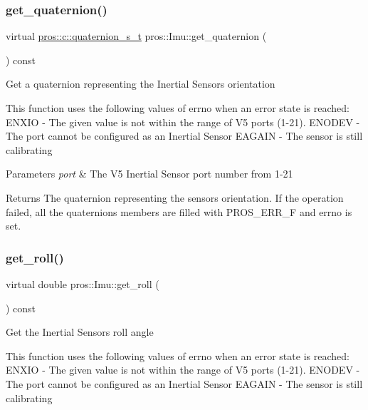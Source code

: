 \subsubsection{\texorpdfstring{get\+\_\+quaternion()}{get\_quaternion()}}
{\footnotesize\ttfamily virtual \hyperlink{imu_8h_a1f3d4bf4251e6ce7cb374297de6390a1}{pros\+::c\+::quaternion\+\_\+s\+\_\+t} pros\+::\+Imu\+::get\+\_\+quaternion (\begin{DoxyParamCaption}{ }\end{DoxyParamCaption}) const\hspace{0.3cm}{\ttfamily [virtual]}}

Get a quaternion representing the Inertial Sensor\textquotesingle{}s orientation

This function uses the following values of errno when an error state is reached\+: E\+N\+X\+IO -\/ The given value is not within the range of V5 ports (1-\/21). E\+N\+O\+D\+EV -\/ The port cannot be configured as an Inertial Sensor E\+A\+G\+A\+IN -\/ The sensor is still calibrating


\begin{DoxyParams}{Parameters}
{\em port} & The V5 Inertial Sensor port number from 1-\/21 \\
\hline
\end{DoxyParams}
\begin{DoxyReturn}{Returns}
The quaternion representing the sensor\textquotesingle{}s orientation. If the operation failed, all the quaternion\textquotesingle{}s members are filled with P\+R\+O\+S\+\_\+\+E\+R\+R\+\_\+F and errno is set. 
\end{DoxyReturn}
\mbox{\label{classpros_1_1Imu_a8ec8c7bbb7ee9d9d1c9dca5d992c57b1}} 
\subsubsection{\texorpdfstring{get\+\_\+roll()}{get\_roll()}}
{\footnotesize\ttfamily virtual double pros\+::\+Imu\+::get\+\_\+roll (\begin{DoxyParamCaption}{ }\end{DoxyParamCaption}) const\hspace{0.3cm}{\ttfamily [virtual]}}

Get the Inertial Sensor\textquotesingle{}s roll angle

This function uses the following values of errno when an error state is reached\+: E\+N\+X\+IO -\/ The given value is not within the range of V5 ports (1-\/21). E\+N\+O\+D\+EV -\/ The port cannot be configured as an Inertial Sensor E\+A\+G\+A\+IN -\/ The sensor is still calibrating


